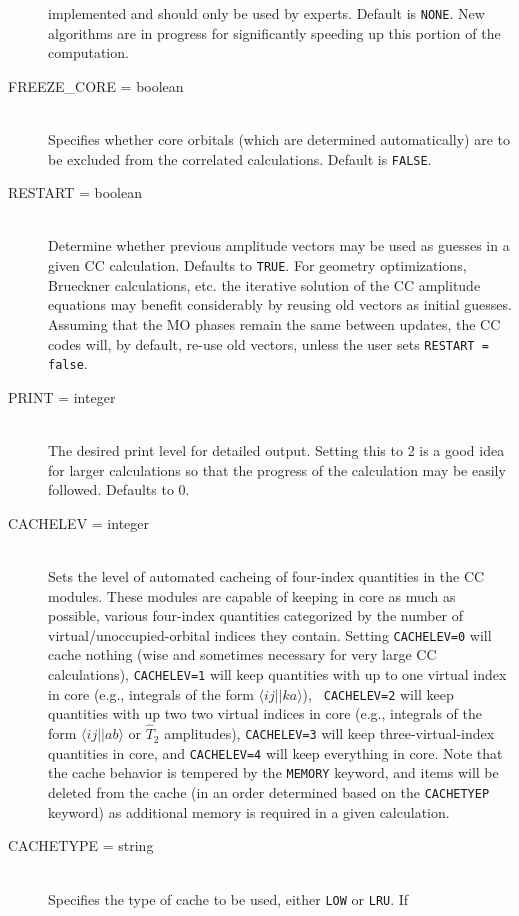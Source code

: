 \begin{description}
implemented and should only be used by experts.  Default is {\tt NONE}.
New algorithms are in progress for significantly speeding up this portion
of the computation.
\item[FREEZE\_CORE = boolean]\mbox{}\\
Specifies whether core orbitals (which are determined automatically) are to
be excluded from the correlated calculations.  Default is {\tt FALSE}.
\item[RESTART = boolean]\mbox{}\\ Determine whether previous amplitude
vectors may be used as guesses in a given CC calculation.  Defaults to
{\tt TRUE}. For geometry optimizations, Brueckner calculations, etc. the
iterative solution of the CC amplitude equations may benefit considerably
by reusing old vectors as initial guesses.  Assuming that the MO phases
remain the same between updates, the CC codes will, by default, re-use
old vectors, unless the user sets {\tt RESTART = false}.
\item[PRINT = integer]\mbox{}\\
The desired print level for detailed output.  Setting this to 2 is a good
idea for larger calculations so that the progress of the calculation may be
easily followed.  Defaults to 0.
\item[CACHELEV = integer]\mbox{}\\
Sets the level of automated cacheing of four-index quantities in the CC
modules.   These modules are capable of keeping in core as much as
possible, various four-index quantities categorized by the number of
virtual/unoccupied-orbital indices they contain.  Setting {\tt CACHELEV=0}
will cache nothing (wise and sometimes necessary for very large CC 
calculations), {\tt CACHELEV=1} will keep quantities with up to one virtual
index in core (e.g., integrals of the form $\langle ij||ka\rangle$), {\tt
CACHELEV=2} will keep quantities with up two two virtual indices in core
(e.g., integrals of the form $\langle ij||ab \rangle$ or $\hat{T}_2$
amplitudes), {\tt CACHELEV=3} will keep three-virtual-index quantities in
core, and {\tt CACHELEV=4} will keep everything in core.  Note that the
cache behavior is tempered by the {\tt MEMORY} keyword, and items will be
deleted from the cache (in an order determined based on the {\tt CACHETYEP}
keyword) as additional memory is required in a given calculation.
\item[CACHETYPE = string]\mbox{}\\
Specifies the type of cache to be used, either {\tt LOW} or {\tt LRU}.  If

\end{description}
